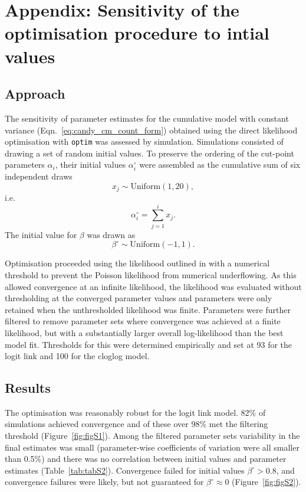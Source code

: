 \newpage
\appendix
\renewcommand\thefigure{S\arabic{figure}}    
\setcounter{figure}{0} 
\renewcommand\thetable{S\arabic{table}}    
\setcounter{table}{0}

\section{Appendix: Sensitivity of the optimisation procedure to intial values}
\subsection{Approach}
\label{sec:appendix}
The sensitivity of parameter estimates for the cumulative model with constant variance (Eqn.~\ref{eq:candy_cm_count_form}) obtained using the direct likelihood optimisation with \verb+optim+ was assessed by simulation.
Simulations consisted of drawing a set of random initial values. To preserve the ordering of the cut-point parameters $\alpha_i$, their initial values $\alpha^{\circ}_i$ were assembled as the cumulative sum of six independent draws $$x_j \sim \mathrm{Uniform}(1,20),$$ i.e. $$\alpha^{\circ}_i = \sum_{j=1}^i x_j.$$ The initial value for $\beta$ was drawn as $$\beta^{\circ}\sim\mathrm{Uniform}(-1,1).$$

Optimisation proceeded using the likelihood outlined in with a numerical threshold to prevent the Poisson likelihood from numerical underflowing. As this allowed convergence at an infinite likelihood, the likelihood was evaluated without thresholding at the converged parameter values and parameters were only retained when the unthresholded likelihood was finite. 
Parameters were further filtered to remove parameter sets where convergence was achieved at a finite likelihood, but with a substantially larger overall log-likelihood than the best model fit. Thresholds for this were determined empirically and set at 93 for the logit link and 100 for the cloglog model.

\subsection{Results}
The optimisation was reasonably robust for the logit link model. 82\% of simulations achieved convergence and of these over 98\% met the filtering threshold (Figure~\ref{fig:figS1}). Among the filtered parameter sets variability in the final estimates was small (parameter-wise coefficients of variation were all smaller than 0.5\%) and there was no correlation between initial values and parameter estimates (Table~\ref{tab:tabS2}). Convergence failed for initial values $\beta^{\circ}>0.8$, and convergence failures were likely, but not guaranteed for $\beta^{\circ}\approx 0$ (Figure~\ref{fig:figS2}).

